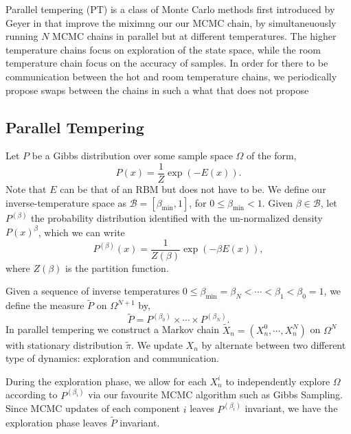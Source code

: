 \documentclass[12pt]{article}
\begin{document}
Parallel tempering (PT) is a class of Monte Carlo methods first introduced by Geyer in \cite{geyer1991markov} that improve the miximng our our MCMC chain, by simultaneuously running $N$ MCMC chains in parallel but at different temperatures. The higher temperature chains focus on exploration of the state space, while the room temperature chain focus on the accuracy of samples. In order for there to be communication between the hot and room temperature chains, we periodically propose swaps between the chains in such a what that does not propose 


\subsection{Parallel Tempering}\label{sec_PT}
Let $P$ be a Gibbs distribution over some sample space $\Omega$ of the form,
\[P(x)=\frac{1}{Z} \exp(-E(x)).\]
Note that $E$ can be that of an RBM but does not have to be. We define our inverse-temperature space as $\mathcal{B}=[\beta_{\min},1]$, for $0\leq \beta_{\min}<1$. Given $\beta\in\mathcal{B}$, let $P^{(\beta)}$ the probability distribution identified with the un-normalized density $P(x)^\beta$, which we can write
\[P^{(\beta)}(x)= \frac{1}{Z(\beta)} \exp(-\beta E(x)),\]
where $Z(\beta)$ is the partition function. 

Given a sequence of inverse temperatures $0\leq\beta_{\min}= \beta_N<\cdots<\beta_{1}<\beta_0=1$, we define the measure $\tilde{P}$ on $\Omega^{N+1}$ by,
\[\tilde{P}=P^{(\beta_0)}\times\cdots\times P^{(\beta_N)}.\]
In parallel tempering we construct a Markov chain $\tilde{X}_n=(X_n^{0},\cdots, X^{N}_n)$ on $\Omega^N$ with stationary distribution $\tilde{\pi}$. We update $X_n$ by alternate between two different type of dynamics: exploration and communication. 

During the exploration phase, we allow for each $X_n^i$ to independently explore $\Omega$ according to $P^{(\beta_i)}$ via our favourite MCMC algorithm such as Gibbs Sampling. Since MCMC updates of each component $i$ leaves $P^{(\beta_i)}$ invariant, we have the exploration phase leaves $\tilde{P}$ invariant.
\end{document}
